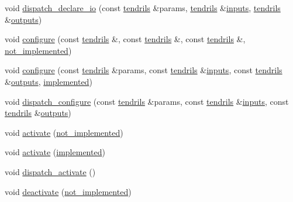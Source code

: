 \begin{DoxyCompactItemize}
\item 
void \hyperlink{structecto_1_1cell___ad95920d295860b791e3fa733fb0745db}{dispatch\-\_\-declare\-\_\-io} (const \hyperlink{classecto_1_1tendrils}{tendrils} \&params, \hyperlink{classecto_1_1tendrils}{tendrils} \&\hyperlink{structecto_1_1cell_a65099b0458a7761b8bfa7a1ddc17e92f}{inputs}, \hyperlink{classecto_1_1tendrils}{tendrils} \&\hyperlink{structecto_1_1cell_a93951743b603faba35312ebdb07ceb22}{outputs})
\item 
void \hyperlink{structecto_1_1cell___a53ab13ad9e8dd9fef55377d85674ff5a}{configure} (const \hyperlink{classecto_1_1tendrils}{tendrils} \&, const \hyperlink{classecto_1_1tendrils}{tendrils} \&, const \hyperlink{classecto_1_1tendrils}{tendrils} \&, \hyperlink{structecto_1_1cell___a3e48e52421d132bb2bb4e343f771abeb}{not\-\_\-implemented})
\item 
void \hyperlink{structecto_1_1cell___acd3caafa6429801f4e121b469bd152a5}{configure} (const \hyperlink{classecto_1_1tendrils}{tendrils} \&params, const \hyperlink{classecto_1_1tendrils}{tendrils} \&\hyperlink{structecto_1_1cell_a65099b0458a7761b8bfa7a1ddc17e92f}{inputs}, const \hyperlink{classecto_1_1tendrils}{tendrils} \&\hyperlink{structecto_1_1cell_a93951743b603faba35312ebdb07ceb22}{outputs}, \hyperlink{structecto_1_1cell___a63c5c3dd95630a508017730ee345c23a}{implemented})
\item 
void \hyperlink{structecto_1_1cell___a953e526cefd3c419a01717740eab9227}{dispatch\-\_\-configure} (const \hyperlink{classecto_1_1tendrils}{tendrils} \&params, const \hyperlink{classecto_1_1tendrils}{tendrils} \&\hyperlink{structecto_1_1cell_a65099b0458a7761b8bfa7a1ddc17e92f}{inputs}, const \hyperlink{classecto_1_1tendrils}{tendrils} \&\hyperlink{structecto_1_1cell_a93951743b603faba35312ebdb07ceb22}{outputs})
\item 
void \hyperlink{structecto_1_1cell___a06dd6747607ad7da98f104bb258fbcbb}{activate} (\hyperlink{structecto_1_1cell___a3e48e52421d132bb2bb4e343f771abeb}{not\-\_\-implemented})
\item 
void \hyperlink{structecto_1_1cell___a8c0319bad42186d2b79a32f7ade1376a}{activate} (\hyperlink{structecto_1_1cell___a63c5c3dd95630a508017730ee345c23a}{implemented})
\item 
void \hyperlink{structecto_1_1cell___a31437fcb5a15e57e8287719f48cecbdd}{dispatch\-\_\-activate} ()
\item 
void \hyperlink{structecto_1_1cell___aa553319fd69477ddf5c2c45cb5c5e3d2}{deactivate} (\hyperlink{structecto_1_1cell___a3e48e52421d132bb2bb4e343f771abeb}{not\-\_\-implemented})

\end{DoxyCompactItemize}
